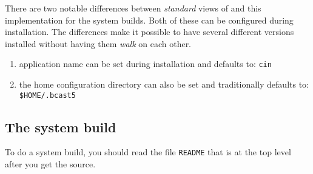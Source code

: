 There are two notable differences between \textit{standard} views
of \CGG{} and this implementation for the system builds.  Both of
these can be configured during installation.  The differences make
it possible to have several different versions installed without
having them \textit{walk} on each other.

\begin{enumerate}
\item application name can be set during installation and defaults
  to: \texttt{cin}
\item the home configuration directory can also be set and
  traditionally defaults to: \texttt{\$HOME/.bcast5}
\end{enumerate}


\subsection{The system build}
\label{sec:system-build}

To do a system build, you should read the file
\texttt{README} that is at the top level after you get the source.

